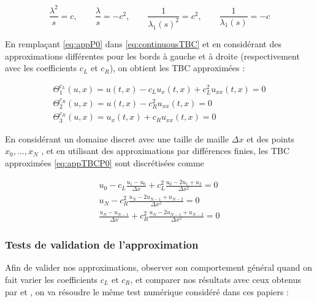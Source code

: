 \begin{equation}
	\label{eq:appP0}
	\frac{\lambda^2}{s}  = c, \qquad
	\frac{\lambda}{s}  = -c^2, \qquad
	\frac{1}{\lambda_1(s)^2}  = c^2,\qquad 
	 \frac{1}{\lambda_1(s)}  = -c 
\end{equation}

\indent En remplaçant \eqref{eq:appP0}  dans \eqref{eq:continuousTBC} et en considérant des approximations différentes pour les bords à gauche et à droite (respectivement avec les coefficients $c_L$ et $c_R$), on obtient les TBC approximées :

\begin{equation}
\label{eq:appTBCP0}
    \begin{gathered}
        \Theta_1^{c_L}(u,x) = u(t,x) - c_L u_x(t,x)  + c_L^2  u_{xx}(t,x) = 0 \\
        \Theta_2^{c_R}(u,x) = u(t,x) - c_R^2  u_{xx}(t,x) = 0 \\
        \Theta_3^{c_R}(u,x) = u_x(t,x) + c_R u_{xx}(t,x)= 0 
    \end{gathered}
\end{equation}

\indent En considérant un domaine discret avec une taille de maille $\Delta x$ et des points $x_0, ..., x_N$ , et en utilisant des approximations par différences finies, les TBC approximées \eqref{eq:appTBCP0} sont discrétisées comme

\begin{equation}
\label{eq:appDiscTBCP0}
    \begin{gathered}
        u_0 - c_L \frac{u_1 - u_0}{\Delta x}  + c_L^2  \frac{u_0 -2u_1 + u_2}{\Delta x^2} = 0 \\
        u_N - c_R^2    \frac{u_N -2u_{N-1} + u_{N-2}}{\Delta x^2} = 0 \\
        \frac{u_N - u_{N-1}}{\Delta x}  + c_R^2    \frac{u_N -2u_{N-1} + u_{N-2}}{\Delta x^2} = 0 
    \end{gathered}
\end{equation}

\subsubsection{Tests de validation de l'approximation}

\indent Afin de valider nos approximations, observer son comportement général quand on fait varier les coefficients $c_L$ et $c_R$, et comparer nos résultats avec ceux obtenus par \cite{zheng2008} et \cite{besse2015} , on va résoudre le même test numérique considéré dans ces papiers : 

